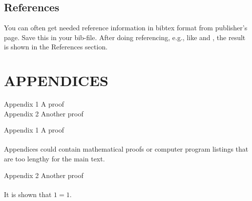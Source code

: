 \documentclass[]{dithesis}
\begin{document}
\section{References}
You can often get needed reference information in bibtex format from publisher's page. Save this in your bib-file. After doing referencing, e.g., like \cite{dithe} and \cite{Mahmood2020}, the result is shown in the References section.





\chapter{APPENDICES} %
Appendix 1 \quad A proof \\
Appendix 2 \quad Another proof


\newpage
\noindent Appendix 1 \quad A proof\\ \\
Appendices could contain mathematical proofs or computer program listings that are too lengthy for the main text.

\newpage
\noindent Appendix 2 \quad Another proof\\ \\
It is shown that $1=1$.
\end{document}
